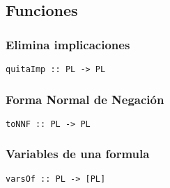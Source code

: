 \documentclass[11pt]{article}
\begin{document}
\subsection{Funciones}
\label{sec:org350b3ae}
\subsubsection{Elimina implicaciones}
\label{sec:org7538e94}
\begin{verbatim}
quitaImp :: PL -> PL
\end{verbatim}
\subsubsection{Forma Normal de Negación}
\label{sec:org8acc98a}
\begin{verbatim}
toNNF :: PL -> PL
\end{verbatim}
\subsubsection{Variables de una formula}
\label{sec:orgeb38236}
\begin{verbatim}
varsOf :: PL -> [PL]
\end{verbatim}
\end{document}
